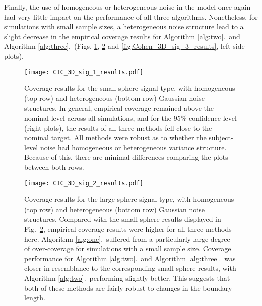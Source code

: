 Finally, the use of homogeneous or heterogeneous noise in the model once again had very little impact on the performance of all three algorithms. Nonetheless, for simulations with small sample sizes, a heterogeneous noise structure lead to a slight decrease in the empirical coverage results for Algorithm \ref{alg:two}.\ and Algorithm \ref{alg:three}.\ (Figs. \ref{fig:Cohen_3D_sig_1_results}, \ref{fig:Cohen_3D_sig_2_results} and \ref{fig:Cohen_3D_sig_3_results}, left-side plots).

\begin{figure}[!htbp]
\hspace*{-3.0cm}
\centering
    \texttt{[image: CIC\_3D\_sig\_1\_results.pdf]}
\caption{Coverage results for the small sphere signal type, with homogeneous (top row) and heterogeneous (bottom row) Gaussian noise structures. In general, empirical coverage remained above the nominal level across all simulations, and for the 95\% confidence level (right plots), the results of all three methods fell close to the nominal target. All methods were robust as to whether the subject-level noise had homogeneous or heterogeneous variance structure. Because of this, there are minimal differences comparing the plots between both rows.}
\label{fig:Cohen_3D_sig_1_results}
\end{figure}

\begin{figure}[!htbp]
\hspace*{-3.0cm}
\centering
    \texttt{[image: CIC\_3D\_sig\_2\_results.pdf]}
\caption{Coverage results for the large sphere signal type, with homogeneous (top row) and heterogeneous (bottom row) Gaussian noise structures. Compared with the small sphere results displayed in Fig.\ \ref{fig:Cohen_3D_sig_2_results}, empirical coverage results were higher for all three methods here. Algorithm \ref{alg:one}.\ suffered from a particularly large degree of over-coverage for simulations with a small sample size. Coverage performance for Algorithm \ref{alg:two}.\ and Algorithm \ref{alg:three}.\ was closer in resemblance to the corresponding small sphere results, with Algorithm \ref{alg:two}.\ performing slightly better. This suggests that both of these methods are fairly robust to changes in the boundary length.} 
\label{fig:Cohen_3D_sig_2_results}
\end{figure}

